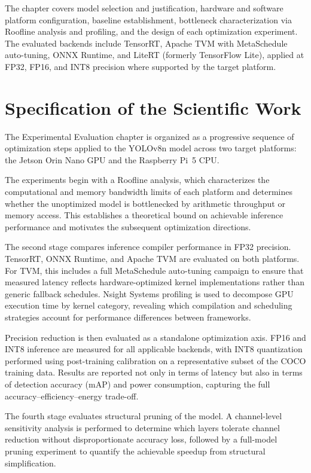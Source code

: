 \documentclass[12pt,a4paper]{report}
\begin{document}
The chapter covers model selection and justification, hardware and software platform configuration,
baseline establishment, bottleneck characterization via Roofline analysis and profiling, and the
design of each optimization experiment.
The evaluated backends include TensorRT, Apache TVM with MetaSchedule auto-tuning, ONNX Runtime,
and LiteRT (formerly TensorFlow Lite), applied at FP32, FP16, and INT8 precision where supported
by the target platform.

\section{Specification of the Scientific Work}

The Experimental Evaluation chapter is organized as a progressive sequence of optimization steps applied
to the YOLOv8n model across two target platforms: the Jetson Orin Nano GPU and the Raspberry Pi~5 CPU.

The experiments begin with a Roofline analysis, which characterizes the computational and memory
bandwidth limits of each platform and determines whether the unoptimized model is bottlenecked by
arithmetic throughput or memory access.
This establishes a theoretical bound on achievable inference performance and motivates the subsequent
optimization directions.

The second stage compares inference compiler performance in FP32 precision.
TensorRT, ONNX Runtime, and Apache TVM are evaluated on both platforms.
For TVM, this includes a full MetaSchedule auto-tuning campaign to ensure that measured latency
reflects hardware-optimized kernel implementations rather than generic fallback schedules.
Nsight Systems profiling is used to decompose GPU execution time by kernel category, revealing which
compilation and scheduling strategies account for performance differences between frameworks.

Precision reduction is then evaluated as a standalone optimization axis.
FP16 and INT8 inference are measured for all applicable backends, with INT8 quantization performed
using post-training calibration on a representative subset of the COCO training data.
Results are reported not only in terms of latency but also in terms of detection accuracy (mAP) and
power consumption, capturing the full accuracy--efficiency--energy trade-off.

The fourth stage evaluates structural pruning of the model.
A channel-level sensitivity analysis is performed to determine which layers tolerate channel reduction
without disproportionate accuracy loss, followed by a full-model pruning experiment to quantify the
achievable speedup from structural simplification.
\end{document}
